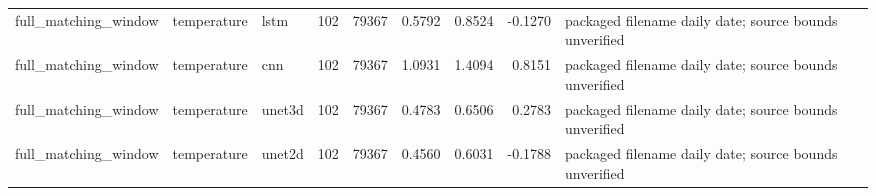 \begin{tabular}{lllrrrrrl}
full_matching_window & temperature & lstm & 102 & 79367 & 0.5792 & 0.8524 & -0.1270 & packaged filename daily date; source bounds unverified \\
full_matching_window & temperature & cnn & 102 & 79367 & 1.0931 & 1.4094 & 0.8151 & packaged filename daily date; source bounds unverified \\
full_matching_window & temperature & unet3d & 102 & 79367 & 0.4783 & 0.6506 & 0.2783 & packaged filename daily date; source bounds unverified \\
full_matching_window & temperature & unet2d & 102 & 79367 & 0.4560 & 0.6031 & -0.1788 & packaged filename daily date; source bounds unverified \\
\bottomrule
\end{tabular}
